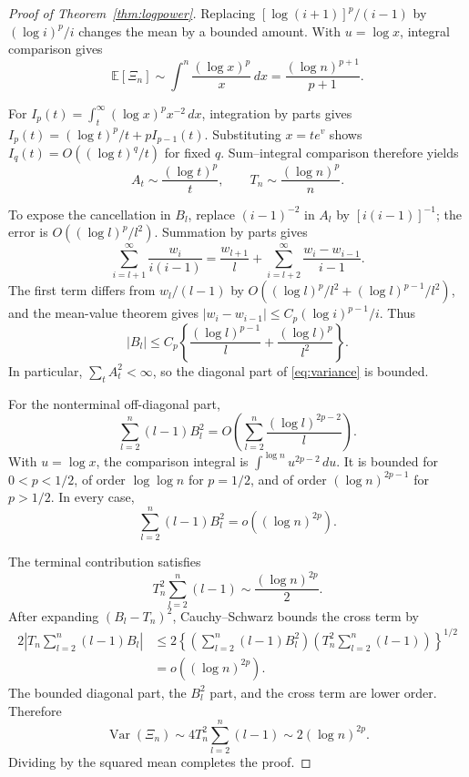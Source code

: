 \documentclass[11pt]{article}
\begin{document}
\begin{proof}[Proof of Theorem~\ref{thm:logpower}]
Replacing $[\log(i+1)]^p/(i-1)$ by $(\log i)^p/i$ changes the mean by a
bounded amount.  With $u=\log x$, integral comparison gives
\[
\mathbb E[\Xi_n]\sim\int^n\frac{(\log x)^p}{x}\,dx
=\frac{(\log n)^{p+1}}{p+1}.
\]

For $I_p(t)=\int_t^\infty(\log x)^p x^{-2}\,dx$, integration by parts gives
$I_p(t)=(\log t)^p/t+pI_{p-1}(t)$.  Substituting $x=te^v$ shows
$I_q(t)=O((\log t)^q/t)$ for fixed $q$.  Sum--integral comparison therefore
yields
\begin{equation}
A_t\sim\frac{(\log t)^p}{t},\qquad
T_n\sim\frac{(\log n)^p}{n}.
\label{eq:tails}
\end{equation}

To expose the cancellation in $B_l$, replace $(i-1)^{-2}$ in $A_l$ by
$[i(i-1)]^{-1}$; the error is $O((\log l)^p/l^2)$.  Summation by parts gives
\[
\sum_{i=l+1}^\infty\frac{w_i}{i(i-1)}
=\frac{w_{l+1}}{l}+\sum_{i=l+2}^\infty\frac{w_i-w_{i-1}}{i-1}.
\]
The first term differs from $w_l/(l-1)$ by
$O((\log l)^p/l^2+(\log l)^{p-1}/l^2)$, and the mean-value theorem gives
$|w_i-w_{i-1}|\leq C_p(\log i)^{p-1}/i$.  Thus
\begin{equation}
|B_l|\leq C_p\left\{\frac{(\log l)^{p-1}}{l}
+\frac{(\log l)^p}{l^2}\right\}.
\label{eq:Bbound}
\end{equation}
In particular, $\sum_tA_t^2<\infty$, so the diagonal part of
\eqref{eq:variance} is bounded.

For the nonterminal off-diagonal part,
\[
\sum_{l=2}^n(l-1)B_l^2
=O\left(\sum_{l=2}^n\frac{(\log l)^{2p-2}}{l}\right).
\]
With $u=\log x$, the comparison integral is
$\int^{\log n}u^{2p-2}\,du$.  It is bounded for $0<p<1/2$, of order
$\log\log n$ for $p=1/2$, and of order $(\log n)^{2p-1}$ for $p>1/2$.
In every case,
\begin{equation}
\sum_{l=2}^n(l-1)B_l^2=o((\log n)^{2p}).
\label{eq:Blower}
\end{equation}

The terminal contribution satisfies
\[
T_n^2\sum_{l=2}^n(l-1)\sim\frac{(\log n)^{2p}}2.
\]
After expanding $(B_l-T_n)^2$, Cauchy--Schwarz bounds the cross term by
\begin{align*}
2\left|T_n\sum_{l=2}^n(l-1)B_l\right|
&\leq2\left\{
\left(\sum_{l=2}^n(l-1)B_l^2\right)
\left(T_n^2\sum_{l=2}^n(l-1)\right)\right\}^{1/2}\\
&=o((\log n)^{2p}).
\end{align*}
The bounded diagonal part, the $B_l^2$ part, and the cross term are lower
order.  Therefore
\[
\operatorname{Var}(\Xi_n)
\sim4T_n^2\sum_{l=2}^n(l-1)\sim2(\log n)^{2p}.
\]
Dividing by the squared mean completes the proof.
\end{proof}
\end{document}
